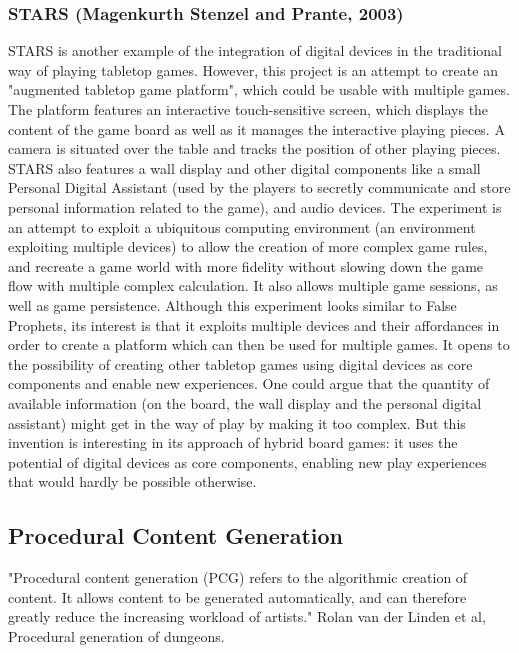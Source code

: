 \subsubsection{STARS (Magenkurth Stenzel and Prante, 2003)}
STARS is another example of the integration of digital devices in the traditional way of playing tabletop games. However, this project is an attempt to create an "augmented tabletop game platform", which could be usable with multiple games. The platform features an interactive touch-sensitive screen, which displays the content of the game board as well as it manages the interactive playing pieces. A camera is situated over the table and tracks the position of other playing pieces. STARS also features a wall display and other digital components like a small Personal Digital Assistant (used by the players to secretly communicate and store personal information related to the game), and audio devices. The experiment is an attempt to exploit a ubiquitous computing environment (an environment exploiting multiple devices) to allow the creation of more complex game rules, and recreate a game world with more fidelity without slowing down the game flow with multiple complex calculation. It also allows multiple game sessions, as well as game persistence. Although this experiment looks similar to False Prophets, its interest is that it exploits multiple devices and their affordances in order to create a platform which can then be used for multiple games. It opens to the possibility of creating other tabletop games using digital devices as core components and enable new experiences. One could argue that the quantity of available information (on the board, the wall display and the personal digital assistant) might get in the way of play by making it too complex. But this invention is interesting in its approach of hybrid board games: it uses the potential of digital devices as core components, enabling new play experiences that would hardly be possible otherwise.
\subsection{Procedural Content Generation}
"Procedural content generation (PCG) refers to the algorithmic creation of content. It allows content to be generated automatically, and can therefore greatly reduce the increasing workload of artists." Rolan van der Linden et al, Procedural generation of dungeons.

